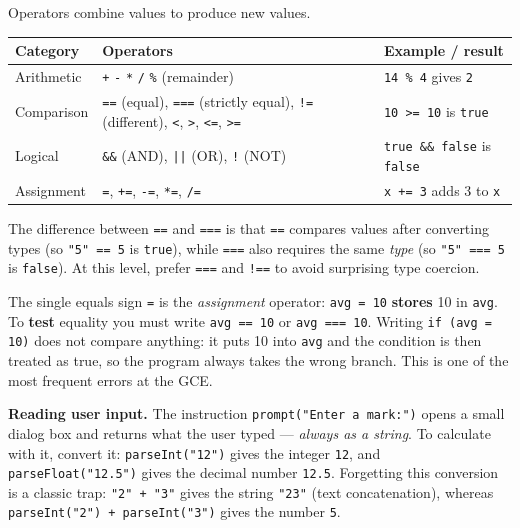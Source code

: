 \documentclass[11pt]{article}
\newcounter{popsec}
\newcounter{popsub}
\newcommand{\courssub}[1]{%
  \stepcounter{popsub}%
  \par\vspace{9pt}\noindent{\popxbold\fontsize{11.5}{13}\selectfont\color{popink}{\color{poporange}\thepopsec.\thepopsub}\hspace{6pt}#1}\par\nopagebreak\vspace{4pt}
}
\begin{document}
\courssub{Operators}

Operators combine values to produce new values.

\begin{center}
\begin{tabularx}{\linewidth}{|l|X|l|}
\hline
\rowcolor{popblueL} \textbf{Category} & \textbf{Operators} & \textbf{Example / result} \\
\hline
Arithmetic & \texttt{+} \quad \texttt{-} \quad \texttt{*} \quad \texttt{/} \quad \texttt{\%} (remainder) & \texttt{14 \% 4} gives \texttt{2} \\
\hline
Comparison & \texttt{==} (equal), \texttt{===} (strictly equal), \texttt{!=} (different), \texttt{<}, \texttt{>}, \texttt{<=}, \texttt{>=} & \texttt{10 >= 10} is \texttt{true} \\
\hline
Logical & \texttt{\&\&} (AND), \texttt{||} (OR), \texttt{!} (NOT) & \texttt{true \&\& false} is \texttt{false} \\
\hline
Assignment & \texttt{=}, \texttt{+=}, \texttt{-=}, \texttt{*=}, \texttt{/=} & \texttt{x += 3} adds 3 to \texttt{x} \\
\hline
\end{tabularx}
\end{center}

The difference between \texttt{==} and \texttt{===} is that \texttt{==} compares values after converting types (so \texttt{"5" == 5} is \texttt{true}), while \texttt{===} also requires the same \emph{type} (so \texttt{"5" === 5} is \texttt{false}). At this level, prefer \texttt{===} and \texttt{!==} to avoid surprising type coercion.

\begin{attention}[Assignment \texttt{=} versus comparison \texttt{==} / \texttt{===}]
The single equals sign \texttt{=} is the \emph{assignment} operator: \texttt{avg = 10} \textbf{stores} 10 in \texttt{avg}. To \textbf{test} equality you must write \texttt{avg == 10} or \texttt{avg === 10}. Writing \texttt{if (avg = 10)} does not compare anything: it puts 10 into \texttt{avg} and the condition is then treated as true, so the program always takes the wrong branch. This is one of the most frequent errors at the GCE.
\end{attention}

\textbf{Reading user input.} The instruction \texttt{prompt("Enter a mark:")} opens a small dialog box and returns what the user typed --- \emph{always as a string}. To calculate with it, convert it: \texttt{parseInt("12")} gives the integer \texttt{12}, and \texttt{parseFloat("12.5")} gives the decimal number \texttt{12.5}. Forgetting this conversion is a classic trap: \texttt{"2" + "3"} gives the string \texttt{"23"} (text concatenation), whereas \texttt{parseInt("2") + parseInt("3")} gives the number \texttt{5}.
\end{document}
